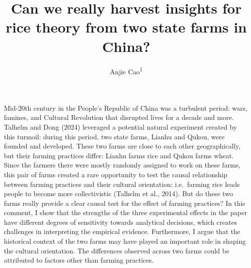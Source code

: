 \documentclass[
  man]{apa6}
\title{Can we really harvest insights for rice theory from two state farms in China?}
\author{Anjie Cao\textsuperscript{1}}
\date{}
\affiliation{\vspace{0.5cm}\textsuperscript{1} Stanford University}
\begin{document}
\maketitle

Mid-20th century in the People's Republic of China was a turbulent period: wars, famines, and Cultural Revolution that disrupted lives for a decade and more. Talhelm and Dong (2024) leveraged a potential natural experiment created by this turmoil: during this period, two state farms, Lianhu and Qukou, were founded and developed. These two farms are close to each other geographically, but their farming practices differ: Lianhu farms rice and Qukou farms wheat. Since the farmers there were mostly randomly assigned to work on these farms, this pair of farms created a rare opportunity to test the causal relationship between farming practices and their cultural orientation: i.e.~farming rice leads people to become more collectivistic (Talhelm et al., 2014). But do these two farms really provide a clear causal test for the effect of farming practices? In this comment, I show that the strengths of the three experimental effects in the paper have different degrees of sensitivity towards analytical decisions, which creates challenges in interpreting the empirical evidence. Furthermore, I argue that the historical context of the two farms may have played an important role in shaping the cultural orientation. The differences observed across two farms could be attributed to factors other than farming practices.
\end{document}
